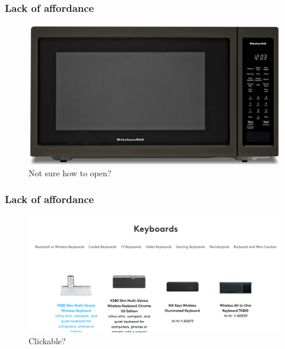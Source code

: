 \documentclass{beamer}
\begin{document}
%	
%	
%

\begin{frame}
\frametitle{Lack of affordance}
\centering
\begin{figure}
	\includegraphics[width=0.7\linewidth]{microwave}
	\caption{Not sure how to open?}
\end{figure}
\end{frame}

\begin{frame}
	\frametitle{Lack of affordance}
	\centering
	\begin{figure}
		\includegraphics[width=0.9\linewidth]{clickable}
		\caption{Clickable?}
	\end{figure}
\end{frame}
\end{document}
